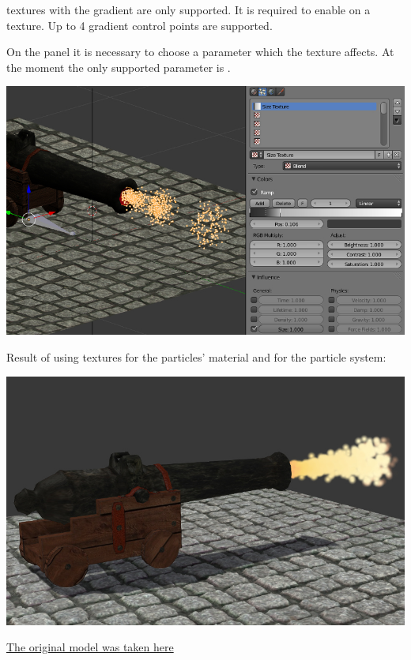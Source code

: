 \documentclass[a4paper,12pt,oneside]{sphinxmanual}
\begin{document}
 textures with the  gradient are only supported. It is required to enable  on a texture. Up to 4 gradient control points are supported.

On the  panel it is necessary to choose a parameter which the texture affects. At the moment the only supported parameter is .

{\hfill\includegraphics[width=1.000\linewidth]{particles_settings_ramp_size.jpg}\hfill}

\begin{DUlineblock}{0em}
\item[] 
\end{DUlineblock}

Result of using textures for the particles' material and for the particle system:

{\hfill\includegraphics[width=1.000\linewidth]{particles_gun.jpg}\hfill}

\href{http://www.blendswap.com/blends/view/13977}{The original model was taken here}
\label{particles_instancing:particles-instancing}
\end{document}
